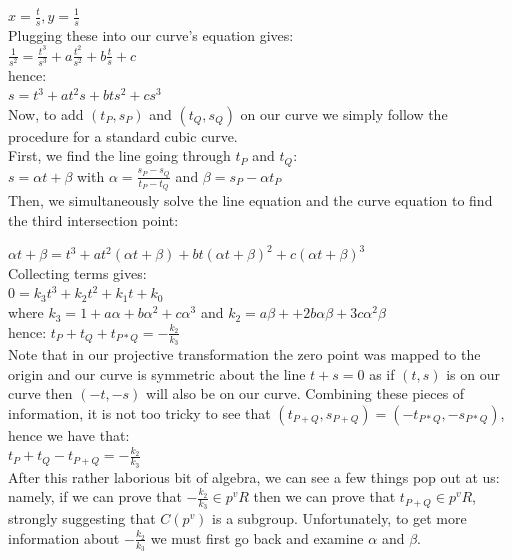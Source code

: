 \documentclass{article}
\begin{document}
$x = \frac{t}{s}, y = \frac{1}{s}$\\

Plugging these into our curve's equation gives:\\

$\frac{1}{s^2} = \frac{t^3}{s^3} + a \frac{t^2}{s^2} + b \frac{t}{s} + c$\\

hence:\\

$s = t^3 + a t^2 s + b t s^2 + c s^3$\\

Now, to add $(t_P, s_P)$ and $(t_Q, s_Q)$ on our curve we simply follow the procedure for a standard cubic curve.\\

First, we find the line going through $t_P$ and $t_Q$:\\

$s = \alpha t + \beta$ with $\alpha = \frac{s_P - s_Q}{t_P - t_Q}$ and $\beta = s_P - \alpha t_P$ \\

Then, we simultaneously solve the line equation and the curve equation to find the third intersection point:

$\alpha t + \beta = t^3 + a t^2 (\alpha t + \beta) + b t (\alpha t + \beta)^2 + c (\alpha t + \beta)^3$\\

Collecting terms gives:\\

$0 = k_3 t^3 + k_2 t^2 + k_1 t + k_0$\\

where $k_3 = 1 + a \alpha + b \alpha^2 + c \alpha^3$ and $k_2 = a \beta + + 2 b \alpha \beta + 3c \alpha^2 \beta$\\

hence: $t_P + t_Q + t_{P*Q} = -\frac{k_2}{k_3}$\\

Note that in our projective transformation the zero point was mapped to the origin and our curve is symmetric about the line $t + s = 0$ as if $(t, s)$ is on our curve then $(-t, -s)$ will also be on our curve. Combining these pieces of information, it is not too tricky to see that $(t_{P + Q}, s_{P + Q}) = (-t_{P * Q}, -s_{P * Q})$, hence we have that:\\

$t_P + t_Q - t_{P+Q} = -\frac{k_2}{k_3}$\\

After this rather laborious bit of algebra, we can see a few things pop out at us: namely, if we can prove that $-\frac{k_2}{k_3} \in p^v R$ then we can prove that $t_{P+Q} \in p^v R$, strongly suggesting that $C(p^v)$ is a subgroup. Unfortunately, to get more information about $-\frac{k_2}{k_3}$ we must first go back and examine $\alpha$ and $\beta$. \\
\end{document}
